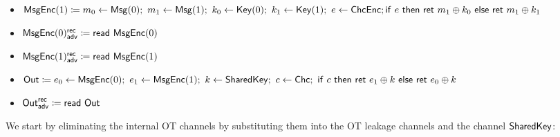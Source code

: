 \begin{itemize}
\item $\mathsf{MsgEnc}(1) \coloneqq m_0 \leftarrow \mathsf{Msg}(0); \ m_1 \leftarrow \mathsf{Msg}(1); \ k_0 \leftarrow \mathsf{Key}(0); \ k_1 \leftarrow \mathsf{Key}(1); \ e \leftarrow \mathsf{ChcEnc}; \\ \mathsf{if} \ e \ \mathsf{then} \ \mathsf{ret} \ m_1 \oplus k_0 \ \mathsf{else} \ \mathsf{ret} \ m_1 \oplus k_1$
\item {\color{blue} $\mathsf{MsgEnc}(0)^{\mathsf{rec}}_{\mathsf{adv}} \coloneqq \mathsf{read} \ \mathsf{MsgEnc}(0)$}
\item {\color{blue} $\mathsf{MsgEnc}(1)^{\mathsf{rec}}_{\mathsf{adv}} \coloneqq \mathsf{read} \ \mathsf{MsgEnc}(1)$}
\item $\mathsf{Out} \coloneqq e_0 \leftarrow \mathsf{MsgEnc}(0); \ e_1 \leftarrow \mathsf{MsgEnc}(1); \ k \leftarrow \mathsf{SharedKey}; \ c \leftarrow \mathsf{Chc}; \ \mathsf{if} \ c \ \mathsf{then} \ \mathsf{ret} \ e_1 \oplus k \ \mathsf{else} \ \mathsf{ret} \ e_0 \oplus k$
\item {\color{blue} $\mathsf{Out}^{\mathsf{rec}}_{\mathsf{adv}} \coloneqq \mathsf{read} \ \mathsf{Out}$}
\end{itemize}

\noindent We start by eliminating the internal OT channels by substituting them into the OT leakage channels and the channel $\mathsf{SharedKey}$:

